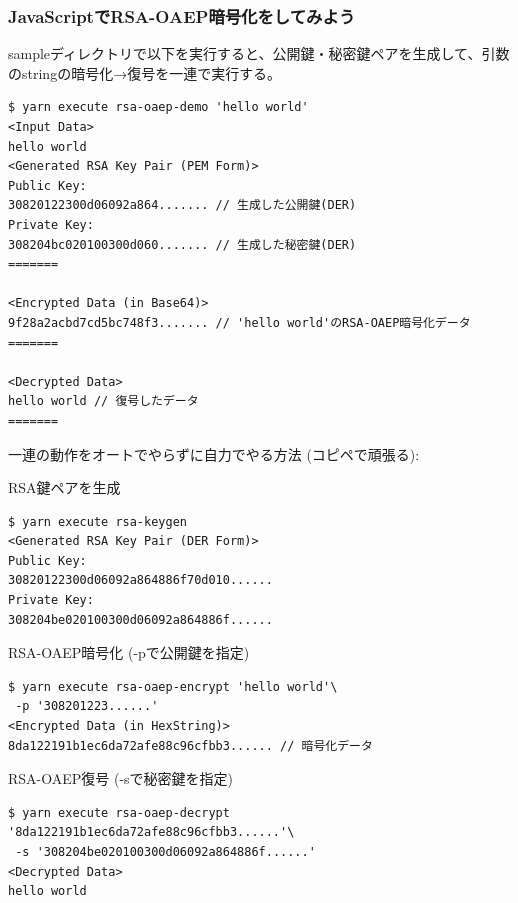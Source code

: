 \documentclass[12pt,dvipdfmx]{beamer}
\begin{document}
\begin{frame}[fragile]
\frametitle{JavaScriptでRSA-OAEP暗号化をしてみよう}
sampleディレクトリで以下を実行すると、公開鍵・秘密鍵ペアを生成して、引数のstringの暗号化→復号を一連で実行する。
\begin{exampleblock}{}
\scriptsize
\begin{verbatim}
$ yarn execute rsa-oaep-demo 'hello world'
<Input Data>
hello world
<Generated RSA Key Pair (PEM Form)>
Public Key:
30820122300d06092a864....... // 生成した公開鍵(DER)
Private Key:
308204bc020100300d060....... // 生成した秘密鍵(DER)
=======

<Encrypted Data (in Base64)>
9f28a2acbd7cd5bc748f3....... // 'hello world'のRSA-OAEP暗号化データ
=======

<Decrypted Data>
hello world // 復号したデータ
=======
\end{verbatim}
\end{exampleblock}
\end{frame}

\begin{frame}[fragile]
\small
一連の動作をオートでやらずに自力でやる方法 (コピペで頑張る):
\begin{exampleblock}{\small RSA鍵ペアを生成}
\scriptsize
\begin{verbatim}
$ yarn execute rsa-keygen
<Generated RSA Key Pair (DER Form)>
Public Key:
30820122300d06092a864886f70d010......
Private Key:
308204be020100300d06092a864886f......
\end{verbatim}
\end{exampleblock}
\begin{exampleblock}{\small RSA-OAEP暗号化 (-pで公開鍵を指定)}
\scriptsize
\begin{verbatim}
$ yarn execute rsa-oaep-encrypt 'hello world'\
 -p '308201223......'
<Encrypted Data (in HexString)>
8da122191b1ec6da72afe88c96cfbb3...... // 暗号化データ
\end{verbatim}
\end{exampleblock}
\begin{exampleblock}{\small RSA-OAEP復号 (-sで秘密鍵を指定)}
\scriptsize
\begin{verbatim}
$ yarn execute rsa-oaep-decrypt '8da122191b1ec6da72afe88c96cfbb3......'\
 -s '308204be020100300d06092a864886f......'
<Decrypted Data>
hello world
\end{verbatim}
\end{exampleblock}
\end{frame}
\end{document}
